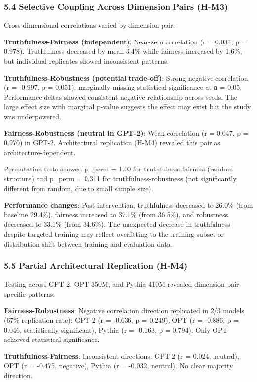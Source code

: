 \subsubsection{5.4 Selective Coupling Across Dimension Pairs (H-M3)}

Cross-dimensional correlations varied by dimension pair:

\textbf{Truthfulness-Fairness (independent)}: Near-zero correlation (r = 0.034, p = 0.978). Truthfulness decreased by mean 3.4\% while fairness increased by 1.6\%, but individual replicates showed inconsistent patterns.

\textbf{Truthfulness-Robustness (potential trade-off)}: Strong negative correlation (r = -0.997, p = 0.051), marginally missing statistical significance at α = 0.05. Performance deltas showed consistent negative relationship across seeds. The large effect size with marginal p-value suggests the effect may exist but the study was underpowered.

\textbf{Fairness-Robustness (neutral in GPT-2)}: Weak correlation (r = 0.047, p = 0.970) in GPT-2. Architectural replication (H-M4) revealed this pair as architecture-dependent.

Permutation tests showed p_perm = 1.00 for truthfulness-fairness (random structure) and p_perm = 0.311 for truthfulness-robustness (not significantly different from random, due to small sample size).

\textbf{Performance changes}: Post-intervention, truthfulness decreased to 26.0\% (from baseline 29.4\%), fairness increased to 37.1\% (from 36.5\%), and robustness decreased to 33.1\% (from 34.6\%). The unexpected decrease in truthfulness despite targeted training may reflect overfitting to the training subset or distribution shift between training and evaluation data.

\subsubsection{5.5 Partial Architectural Replication (H-M4)}

Testing across GPT-2, OPT-350M, and Pythia-410M revealed dimension-pair-specific patterns:

\textbf{Fairness-Robustness}: Negative correlation direction replicated in 2/3 models (67\% replication rate): GPT-2 (r = -0.636, p = 0.249), OPT (r = -0.886, p = 0.046, statistically significant), Pythia (r = -0.163, p = 0.794). Only OPT achieved statistical significance.

\textbf{Truthfulness-Fairness}: Inconsistent directions: GPT-2 (r = 0.024, neutral), OPT (r = -0.475, negative), Pythia (r = -0.032, neutral). No clear majority direction.

